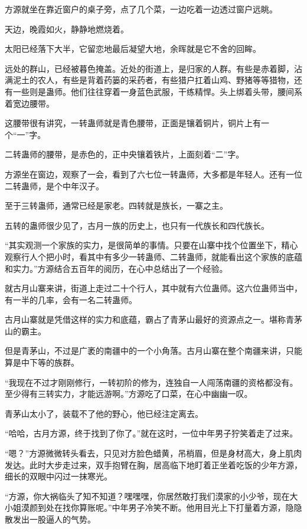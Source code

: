 \begin{this_body}
方源就坐在靠近窗户的桌子旁，点了几个菜，一边吃着一边透过窗户远眺。

天边，晚霞如火，静静地燃烧着。

太阳已经落下大半，它留恋地最后凝望大地，余晖就是它不舍的回眸。

远处的群山，已经被暮色掩盖。近处的街道上，是归家的人群。有些是赤着脚，沾满泥土的农人，有些是背着药篓的采药者，有些猎户扛着山鸡、野猪等等猎物，还有一些则是蛊师。他们往往穿着一身蓝色武服，干练精悍。头上绑着头带，腰间系着宽边腰带。

这腰带很有讲究，一转蛊师就是青色腰带，正面是镶着铜片，铜片上有一个“一”字。

二转蛊师的腰带，是赤色的，正中央镶着铁片，上面刻着“二”字。

方源坐在窗边，观察了一会，看到了六七位一转蛊师，大多都是年轻人。还有一位二转蛊师，是个中年汉子。

至于三转蛊师，通常已经是家老。四转就是族长，一寨之主。

五转的蛊师很少见了，古月一族的历史上，也只有一代族长和四代族长。

“其实观测一个家族的实力，是很简单的事情。只要在山寨中找个位置坐下，精心观察行人个把小时，看其中有多少一转蛊师、二转蛊师，就能看出这个家族的底蕴和实力。”方源结合五百年的阅历，在心中总结出了一个经验。

就古月山寨来讲，街道上走过二十个行人，其中就有六位蛊师。这六位蛊师当中，有一半的几率，会有一名二转蛊师。

古月山寨就是凭借这样的实力和底蕴，霸占了青茅山最好的资源点之一。堪称青茅山的霸主。

但是青茅山，不过是广袤的南疆中的一个小角落。古月山寨在整个南疆来讲，只能算是中下等的族群。

“我现在不过才刚刚修行，一转初阶的修为，连独自一人闯荡南疆的资格都没有。至少得有三转实力，才能远游啊。”方源吃了口菜，在心中幽幽一叹。

青茅山太小了，装载不了他的野心，他已经注定离去。

“哈哈，古月方源，终于找到了你了。”就在这时，一位中年男子狞笑着走了过来。

“嗯？”方源微微转头看去，只见对方脸色蜡黄，吊梢眉，但是身材高大，身上肌肉发达。此时大步走过来，双手抱臂在胸，居高临下地盯着正坐着吃饭的少年方源，细长的双眼中闪过一抹寒光。

“方源，你大祸临头了知不知道？嘿嘿嘿，你居然敢打我们漠家的小少爷，现在大小姐漠颜到处在找你算账呢。”中年男子冷笑不断。他用目光上下打量着方源，隐隐散发出一股逼人的气势。

\end{this_body}

